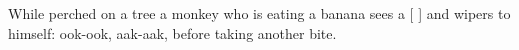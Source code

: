 While perched on a tree a monkey who is eating a banana sees a [ ] and wipers to himself: ook-ook, aak-aak, before taking another bite.
